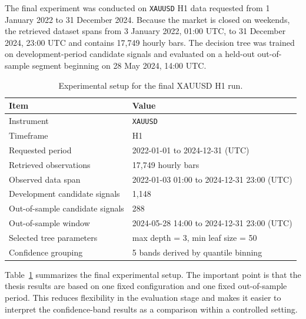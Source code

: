 The final experiment was conducted on \texttt{XAUUSD} H1 data requested from
1 January 2022 to 31 December 2024. Because the market is closed on weekends,
the retrieved dataset spans from 3 January 2022, 01:00 UTC, to 31 December
2024, 23:00 UTC and contains 17,749 hourly bars. The decision tree was trained
on development-period candidate signals and evaluated on a held-out
out-of-sample segment beginning on 28 May 2024, 14:00 UTC.

\begin{table}[htbp]
\centering
\caption{Experimental setup for the final XAUUSD H1 run.}
\label{tab:xauusd-h1-setup}
\small
\begin{tabular}{p{}p{}}
\toprule
Item & Value \\
\midrule
Instrument & \texttt{XAUUSD} \\
Timeframe & H1 \\
Requested period & 2022-01-01 to 2024-12-31 (UTC) \\
Retrieved observations & 17,749 hourly bars \\
Observed data span & 2022-01-03 01:00 to 2024-12-31 23:00 (UTC) \\
Development candidate signals & 1,148 \\
Out-of-sample candidate signals & 288 \\
Out-of-sample window & 2024-05-28 14:00 to 2024-12-31 23:00 (UTC) \\
Selected tree parameters & max depth = 3, min leaf size = 50 \\
Confidence grouping & 5 bands derived by quantile binning \\
\bottomrule
\end{tabular}
\end{table}

Table~\ref{tab:xauusd-h1-setup} summarizes the final experimental setup. The
important point is that the thesis results are based on one fixed configuration
and one fixed out-of-sample period. This reduces flexibility in the evaluation
stage and makes it easier to interpret the confidence-band results as a
comparison within a controlled setting.

